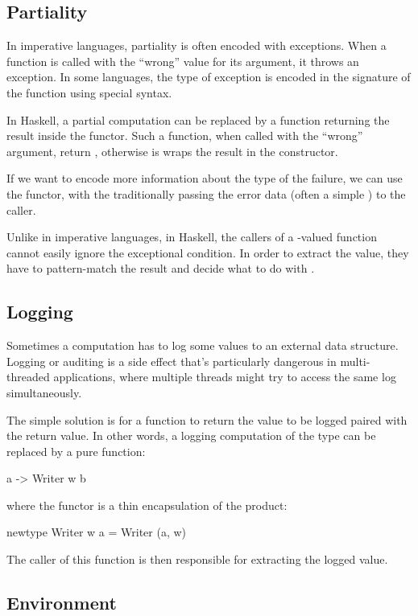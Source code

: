 \documentclass[DaoFP]{subfiles}
\begin{document}
\subsection{Partiality}
In imperative languages, partiality is often encoded with exceptions. When a function is called with the ``wrong'' value for its argument, it throws an exception. In some languages, the type of exception is encoded in the signature of the function using special syntax. 

In Haskell, a partial computation can be replaced by a function returning the result inside the  functor. Such a function, when called with the ``wrong'' argument, return , otherwise is wraps the result in the  constructor.

If we want to encode more information about the type of the failure, we can use the  functor, with the  traditionally passing the error data (often a simple ) to the caller.

Unlike in imperative languages, in Haskell, the callers of a -valued function cannot easily ignore the exceptional condition. In order to extract the value, they have to pattern-match the result and decide what to do with .

\subsection{Logging}

Sometimes a computation has to log some values to an external data structure. Logging or auditing is a side effect that's particularly dangerous in multi-threaded applications, where multiple threads might try to access the same log simultaneously.

The simple solution is for a function to return the value to be logged paired with the return value. In other words, a logging computation of the type  can be replaced by a pure function:
\begin{haskell}
a -> Writer w b
\end{haskell}
where the  functor is a thin encapsulation of the product:
\begin{haskell}
newtype Writer w a = Writer (a, w)
\end{haskell}

The caller of this function is then responsible for extracting the logged value.

\subsection{Environment}
\end{document}

